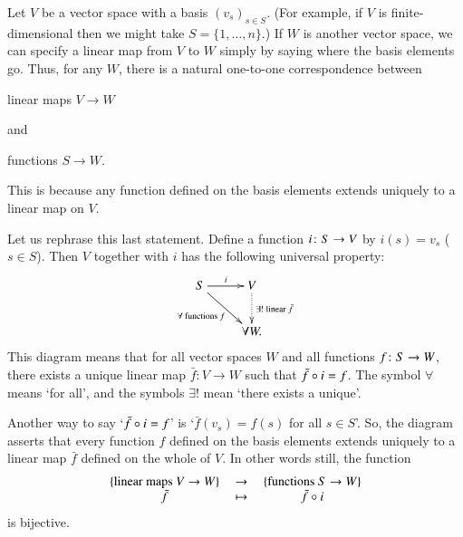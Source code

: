 \begin{iexample}
\label{eg:univ-basis}
Let $V$ be a vector%
%
%
space with a basis $(v_s)_{s \in S}$.  (For example, if $V$ is
finite-dimensional then we might take $S = \{1, \ldots, n\}$.)  If $W$ is
another vector space, we can specify a linear map from $V$ to $W$ simply by
saying where the basis elements go.  Thus, for any $W$, there is a natural
one-to-one correspondence between
%
\begin{displaytext}
linear maps $V \to W$
\end{displaytext}
%
and
%
\begin{displaytext}
functions $S \to W$.
\end{displaytext}
%
This is because any function defined on the basis elements extends
uniquely to a linear map on $V$.

Let us rephrase this last statement.  Define a function $i\from S \to V$ by
$i(s) = v_s$ ($s \in S$).  Then $V$ together with $i$ has the following
universal property:
\[
\xymatrix{
S \ar[r]^i \ar[dr]_{\forall \text{ functions } f}  &
V \ar@{.>}[d]^{\exists ! \text{ linear } \bar{f}} \\
&
\forall W.
}
\]
This diagram means that for all vector spaces $W$ and all functions $f\from
S \to W$, there exists a unique linear map $\bar{f}: V \to W$ such that
$\bar{f} \mathbin{\circ} i = f$.  The symbol $\forall$%
%
%
means `for all', and the symbols $\exists !$%
%
%
 mean `there exists a unique'.%
%
%

Another way to say `$\bar{f} \mathbin{\circ} i = f$' is `$\bar{f}(v_s) = f(s)$ for all
$s \in S$'.  So, the diagram asserts that every function $f$ defined on the
basis elements extends uniquely to a linear map $\bar{f}$ defined on the
whole of $V$.  In other words still, the function
\[
\begin{array}{ccc}
\{ \text{linear maps } V \to W \}     &
\ \to \             &
\{ \text{functions } S \to W \}       \\
\bar{f}        &\mapsto        &\bar{f} \mathbin{\circ} i
\end{array}
\]
is bijective.
\end{iexample}


